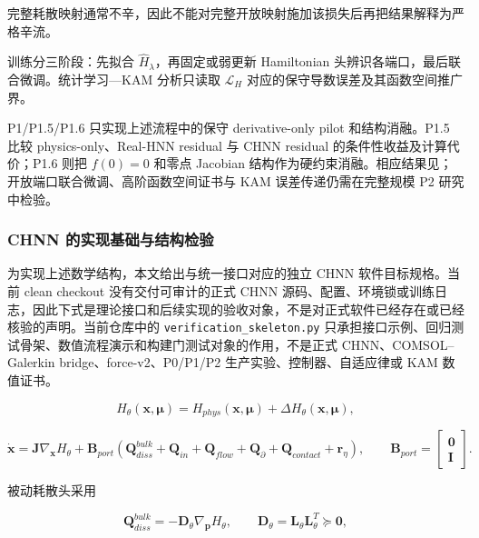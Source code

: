 完整耗散映射通常不辛，因此不能对完整开放映射施加该损失后再把结果解释为严格辛流。

训练分三阶段：先拟合 \({\widehat{H}}_{\lambda}\)，再固定或弱更新 Hamiltonian 头辨识各端口，最后联合微调。统计学习---KAM 分析只读取 \(\mathcal{L}_{H}\) 对应的保守导数误差及其函数空间推广界。

P1/P1.5/P1.6 只实现上述流程中的保守 derivative-only pilot 和结构消融。P1.5 比较 physics-only、Real-HNN residual 与 CHNN residual 的条件性收益及计算代价；P1.6 则把 \(f(0)=0\) 和零点 Jacobian 结构作为硬约束消融。相应结果见；开放端口联合微调、高阶函数空间证书与 KAM 误差传递仍需在完整规模 P2 研究中检验。

\subsubsection{CHNN 的实现基础与结构检验}\label{sec:chnn-4-5-4}

为实现上述数学结构，本文给出与统一接口对应的独立 CHNN 软件目标规格。当前 clean checkout 没有交付可审计的正式 CHNN 源码、配置、环境锁或训练日志，因此下式是理论接口和后续实现的验收对象，不是对正式软件已经存在或已经核验的声明。当前仓库中的 \texttt{verification\_skeleton.py} 只承担接口示例、回归测试骨架、数值流程演示和构建门测试对象的作用，不是正式 CHNN、COMSOL--Galerkin bridge、force-v2、P0/P1/P2 生产实验、控制器、自适应律或 KAM 数值证书。

\begin{equation}
\label{eq:chnn-4-31}
H_{\theta}\left( \mathbf{x},\bm{\mu} \right) = H_{phys}\left( \mathbf{x},\bm{\mu} \right) + \Delta H_{\theta}\left( \mathbf{x},\bm{\mu} \right),
\end{equation}

\begin{equation}
\label{eq:chnn-4-32}
\dot{\mathbf{x}} = \mathbf{J}\nabla_{\mathbf{x}}H_{\theta} + \mathbf{B}_{port}\left( \mathbf{Q}_{diss}^{bulk} + \mathbf{Q}_{in} + \mathbf{Q}_{flow} + \mathbf{Q}_{\partial} + \mathbf{Q}_{contact} + \mathbf{r}_{\eta} \right),\quad\quad\mathbf{B}_{port} = \begin{bmatrix}
\mathbf{0} \\
\mathbf{I}
\end{bmatrix}.
\end{equation}

被动耗散头采用

\begin{equation}
\label{eq:chnn-4-33}
\mathbf{Q}_{diss}^{bulk} = - \mathbf{D}_{\theta}\nabla_{\mathbf{p}}H_{\theta},\quad\quad\mathbf{D}_{\theta} = \mathbf{L}_{\theta}\mathbf{L}_{\theta}^{T} \succcurlyeq \mathbf{0},
\end{equation}


